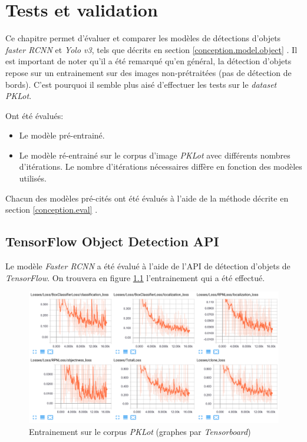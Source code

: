 \chapter{Tests et validation}
Ce chapitre permet d'évaluer et comparer les modèles de détections d'objets \textit{faster RCNN} et \textit{Yolo v3}, tels que décrits en section \ref{conception.model.object} . Il est important de noter qu'il a été remarqué qu'en général, la détection d'objets repose sur un entrainement sur des images non-prétraitées (pas de détection de bords). C'est pourquoi il semble plus aisé d'effectuer les tests sur le \textit{dataset} \textit{PKLot}.

Ont été évalués:
\begin{itemize}
    \item Le modèle pré-entrainé.
    \item Le modèle ré-entrainé sur le corpus d'image \textit{PKLot} avec différents nombres d'itérations. Le nombre d'itérations nécessaires diffère en fonction des modèles utilisés.
\end{itemize}

Chacun des modèles pré-cités ont été évalués à l'aide de la méthode décrite en section \ref{conception.eval} .

\section{TensorFlow Object Detection API}
Le modèle \textit{Faster RCNN} a été évalué à l'aide de l'API de détection d'objets de \textit{TensorFlow}. On trouvera en figure \ref{fig:tensorflow_train} l'entrainement qui a été effectué. 

\begin{figure}[H]
    \includegraphics[width=15cm]{img/tests/tensorflow_pklot_full_train.png}
    \centering
    \caption{Entrainement sur le corpus \textit{PKLot} (graphes par \textit{Tensorboard})}
    \label{fig:tensorflow_train}
\end{figure} 

